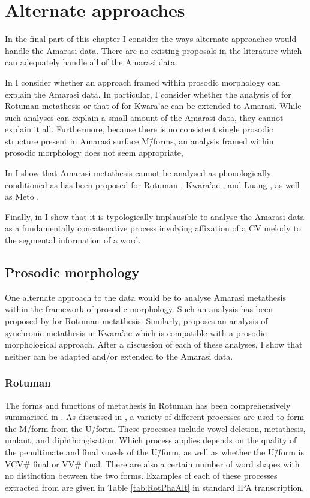 \section{Alternate approaches}\label{sec:AltApp}
In the final part of this chapter I consider
the ways alternate approaches would handle the Amarasi data.
There are no existing proposals in the literature which can
adequately handle all of the Amarasi data.

In  I consider whether an approach framed within
prosodic morphology \citep{mccpr90,mccpr93} can explain the Amarasi data.
In particular, I consider whether the analysis of \cite{mcc00} for Rotuman metathesis
or that of \cite{he04} for Kwara'ae can be extended to Amarasi.
While such analyses can explain a small amount of the Amarasi data,
they cannot explain it all.
Furthermore, because there is no consistent single prosodic structure present
in Amarasi surface M\=/forms, an analysis framed within prosodic morphology
does not seem appropriate,

In  I show that Amarasi
metathesis cannot be analysed as phonologically conditioned
as has been proposed for Rotuman \citep{haki98,mcc00},
Kwara'ae \citep{he04}, and Luang \citep{tata15},
as well as Meto \citep{mccko96}.

Finally, in  I show that it
is typologically implausible to analyse the
Amarasi data as a fundamentally concatenative process
involving affixation of a CV melody to the segmental information of a word.

\subsection{Prosodic morphology}\label{sec:ProMor}
One alternate approach to the data would be to analyse
Amarasi metathesis within the framework of prosodic morphology.
Such an analysis has been proposed by \citet{mcc00} for Rotuman metathesis.
Similarly, \cite{he04} proposes an analysis of synchronic metathesis in
Kwara'ae which is compatible with a prosodic morphological approach.
After a discussion of each of these analyses,
I show that neither can be adapted and/or extended to the Amarasi data.

\subsubsection{Rotuman}\label{sec:ProMorRot}
The forms and functions of metathesis in Rotuman
has been comprehensively summarised in .
As discussed in ,
a variety of different processes are used to form the
M\=/form from the U\=/form. These processes include
vowel deletion, metathesis, umlaut, and diphthongisation.
Which process applies depends on the quality of the penultimate
and final vowels of the U\=/form, as well as
whether the U\=/form is VCV{\#} final or VV{\#} final.
There are also a certain number of word shapes with no distinction between the two forms.
Examples of each of these processes extracted from \cite{ch40}
are given in Table \ref{tab:RotPhaAlt} in standard IPA transcription.

